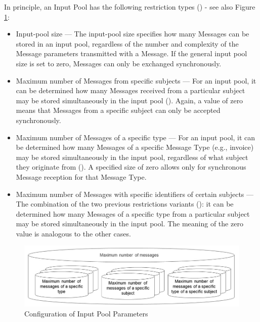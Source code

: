 In principle, an Input Pool has the following restriction types () - see also Figure \ref{fig:input-pool}:

\begin{itemize}
	\item Input-pool size --- The input-pool size specifies how many Messages can be stored in an input pool, regardless of the number and complexity of the Message parameters transmitted with a Message. If the general input pool size is set to zero, Messages can only be exchanged synchronously.
	\item Maximum number of Messages from specific subjects --- For an input pool, it can be determined how many Messages received from a particular subject may be stored simultaneously in the input pool (). Again, a value of zero means that Messages from a specific subject can only be accepted synchronously.
	\item Maximum number of Messages of a specific type --- For an input pool, it can be determined how many Messages of a specific Message Type (e.g., invoice) may be stored simultaneously in the input pool, regardless of what subject they originate from (). A specified size of zero allows only for synchronous Message reception for that Message Type.
	\item Maximum number of Messages with specific identifiers of certain subjects --- The combination of the two previous restrictions variants (): it can be determined how many Messages of a specific type from a particular subject may be stored simultaneously in the input pool. The meaning of the zero value is analogous to the other cases.
\end{itemize}

\begin{figure}[htbp]
	\centering
	\includegraphics[width=12cm]{Figures/Ontology/SubjectInteraction/input-pool-informal.jpg}
	\caption[Input Pool]{Configuration of Input Pool Parameters}
	\label{fig:input-pool}
\end{figure}

